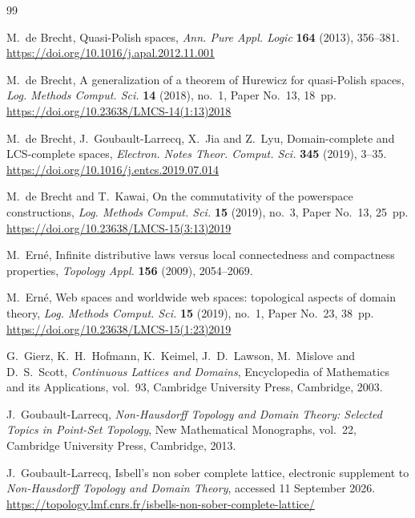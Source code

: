 \documentclass[11pt,reqno]{amsart}
\theoremstyle{definition}
\numberwithin{equation}{section}
\begin{document}
\raggedbottom
\begin{thebibliography}{99}

M.~de Brecht,
Quasi-Polish spaces,
\emph{Ann. Pure Appl. Logic} \textbf{164} (2013), 356--381.
\url{https://doi.org/10.1016/j.apal.2012.11.001}

M.~de Brecht,
A generalization of a theorem of Hurewicz for quasi-Polish spaces,
\emph{Log. Methods Comput. Sci.} \textbf{14} (2018), no.~1,
Paper No.~13, 18~pp.
\url{https://doi.org/10.23638/LMCS-14(1:13)2018}

M.~de Brecht, J.~Goubault-Larrecq, X.~Jia and Z.~Lyu,
Domain-complete and LCS-complete spaces,
\emph{Electron. Notes Theor. Comput. Sci.} \textbf{345} (2019), 3--35.
\url{https://doi.org/10.1016/j.entcs.2019.07.014}

M.~de Brecht and T.~Kawai,
On the commutativity of the powerspace constructions,
\emph{Log. Methods Comput. Sci.} \textbf{15} (2019), no.~3,
Paper No.~13, 25~pp.
\url{https://doi.org/10.23638/LMCS-15(3:13)2019}

M.~Ern\'e,
Infinite distributive laws versus local connectedness and compactness
properties, \emph{Topology Appl.} \textbf{156} (2009), 2054--2069.

M.~Ern\'e,
Web spaces and worldwide web spaces: topological aspects of domain theory,
\emph{Log. Methods Comput. Sci.} \textbf{15} (2019), no.~1,
Paper No.~23, 38~pp.
\url{https://doi.org/10.23638/LMCS-15(1:23)2019}

G.~Gierz, K.~H.~Hofmann, K.~Keimel, J.~D.~Lawson, M.~Mislove and D.~S.~Scott,
\emph{Continuous Lattices and Domains},
Encyclopedia of Mathematics and its Applications, vol.~93,
Cambridge University Press, Cambridge, 2003.

J.~Goubault-Larrecq,
\emph{Non-Hausdorff Topology and Domain Theory: Selected Topics in Point-Set
Topology}, New Mathematical Monographs, vol.~22,
Cambridge University Press, Cambridge, 2013.

J.~Goubault-Larrecq,
Isbell's non sober complete lattice,
electronic supplement to \emph{Non-Hausdorff Topology and Domain Theory},
accessed 11 September 2026.
\url{https://topology.lmf.cnrs.fr/isbells-non-sober-complete-lattice/}


\end{thebibliography}
\end{document}
